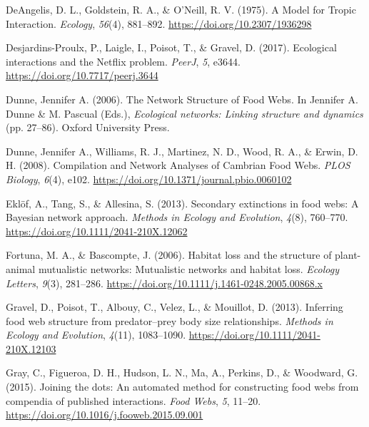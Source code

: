 \documentclass[
]{agujournal2019}
\newlength{\cslhangindent}
\newenvironment{CSLReferences}[2] %
 {\begin{list}{}{%
  \setlength{\itemindent}{0pt}
  \setlength{\leftmargin}{0pt}
  \setlength{\parsep}{0pt}
  \ifodd #1
   \setlength{\leftmargin}{\cslhangindent}
   \setlength{\itemindent}{-1\cslhangindent}
  \fi
  \setlength{\itemsep}{#2\baselineskip}}}
 {\end{list}}
\begin{document}
\begin{CSLReferences}{1}{0}
DeAngelis, D. L., Goldstein, R. A., \& O'Neill, R. V. (1975). A {Model}
for {Tropic Interaction}. \emph{Ecology}, \emph{56}(4), 881--892.
\url{https://doi.org/10.2307/1936298}

Desjardins-Proulx, P., Laigle, I., Poisot, T., \& Gravel, D. (2017).
Ecological interactions and the {Netflix} problem. \emph{PeerJ},
\emph{5}, e3644. \url{https://doi.org/10.7717/peerj.3644}

Dunne, Jennifer A. (2006). The {Network Structure} of {Food Webs}. In
Jennifer A. Dunne \& M. Pascual (Eds.), \emph{Ecological networks:
{Linking} structure and dynamics} (pp. 27--86). Oxford University Press.

Dunne, Jennifer A., Williams, R. J., Martinez, N. D., Wood, R. A., \&
Erwin, D. H. (2008). Compilation and {Network Analyses} of {Cambrian
Food Webs}. \emph{PLOS Biology}, \emph{6}(4), e102.
\url{https://doi.org/10.1371/journal.pbio.0060102}

Eklöf, A., Tang, S., \& Allesina, S. (2013). Secondary extinctions in
food webs: A {Bayesian} network approach. \emph{Methods in Ecology and
Evolution}, \emph{4}(8), 760--770.
\url{https://doi.org/10.1111/2041-210X.12062}

Fortuna, M. A., \& Bascompte, J. (2006). Habitat loss and the structure
of plant-animal mutualistic networks: {Mutualistic} networks and habitat
loss. \emph{Ecology Letters}, \emph{9}(3), 281--286.
\url{https://doi.org/10.1111/j.1461-0248.2005.00868.x}

Gravel, D., Poisot, T., Albouy, C., Velez, L., \& Mouillot, D. (2013).
Inferring food web structure from predator--prey body size
relationships. \emph{Methods in Ecology and Evolution}, \emph{4}(11),
1083--1090. \url{https://doi.org/10.1111/2041-210X.12103}

Gray, C., Figueroa, D. H., Hudson, L. N., Ma, A., Perkins, D., \&
Woodward, G. (2015). Joining the dots: {An} automated method for
constructing food webs from compendia of published interactions.
\emph{Food Webs}, \emph{5}, 11--20.
\url{https://doi.org/10.1016/j.fooweb.2015.09.001}


\end{CSLReferences}
\end{document}
